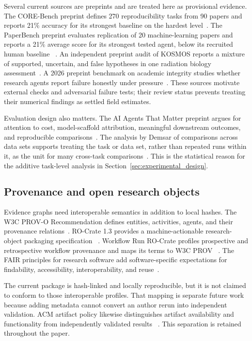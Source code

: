 Several current sources are preprints and are treated here as provisional
evidence. The CORE-Bench preprint defines 270 reproducibility tasks from 90
papers and reports 21\% accuracy for its strongest baseline on the hardest
level~\cite{siegel2024corebench}. The PaperBench preprint evaluates replication
of 20 machine-learning papers and reports a 21\% average score for its
strongest tested agent, below its recruited human baseline
~\cite{starace2025paperbench}. An independent preprint audit of KOSMOS reports
a mixture of supported, uncertain, and false hypotheses in one radiation
biology assessment~\cite{nusrat2025kosmosaudit}. A 2026 preprint benchmark on
academic integrity studies whether research agents report failure honestly
under pressure~\cite{yang2026sciintegrity}. These sources motivate external
checks and adversarial failure tests; their review status prevents treating
their numerical findings as settled field estimates.

Evaluation design also matters. The AI Agents That Matter preprint argues for
attention to cost, model-scaffold attribution, meaningful downstream
outcomes, and reproducible comparisons~\cite{kapoor2024agentsmatter}. The
analysis by Demsar of comparisons across data sets supports treating the task
or data set, rather than repeated runs within it, as the unit for many
cross-task comparisons~\cite{demsar2006}. This is the statistical reason for
the additive task-level analysis in Section~\ref{sec:experimental_design}.

\subsection{Provenance and open research objects}

Evidence graphs need interoperable semantics in addition to local hashes.
The W3C PROV-O Recommendation defines entities, activities, agents, and their
provenance relations~\cite{lebo2013provo}. RO-Crate 1.3 provides a
machine-actionable research-object packaging specification
~\cite{rocrate2026spec}. Workflow Run RO-Crate profiles prospective and
retrospective workflow provenance and maps its terms to W3C PROV
~\cite{leo2024workflowrun}. The FAIR principles for research software add
software-specific expectations for findability, accessibility,
interoperability, and reuse~\cite{barker2022fair4rs}.

The current package is hash-linked and locally reproducible, but it is not
claimed to conform to those interoperable profiles. That mapping is separate
future work because adding metadata cannot convert an author rerun into
independent validation. ACM artifact policy likewise distinguishes artifact
availability and functionality from independently validated results
~\cite{acm2020artifacts}. This separation is retained throughout the paper.
